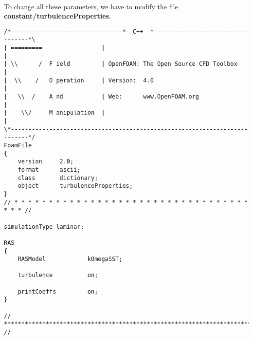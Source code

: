 \paragraph{}
To change all these parameters, we have to modify the file \textbf{constant/turbulenceProperties}.


\begin{footnotesize}
\begin{verbatim}
/*--------------------------------*- C++ -*----------------------------------*\
| =========                 |                                                 |
| \\      /  F ield         | OpenFOAM: The Open Source CFD Toolbox           |
|  \\    /   O peration     | Version:  4.0                                   |
|   \\  /    A nd           | Web:      www.OpenFOAM.org                      |
|    \\/     M anipulation  |                                                 |
\*---------------------------------------------------------------------------*/
FoamFile
{
    version     2.0;
    format      ascii;
    class       dictionary;
    object      turbulenceProperties;
}
// * * * * * * * * * * * * * * * * * * * * * * * * * * * * * * * * * * * * * //

simulationType laminar;

RAS
{
    RASModel            kOmegaSST;

    turbulence          on;

    printCoeffs         on;
}

// ************************************************************************* //

\end{verbatim}
\end{footnotesize}